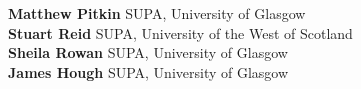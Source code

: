 \textbf{Matthew Pitkin} SUPA, University of Glasgow \\
\textbf{Stuart Reid} SUPA, University of the West of Scotland \\
\textbf{Sheila Rowan} SUPA, University of Glasgow \\
\textbf{James Hough} SUPA, University of Glasgow \\

  